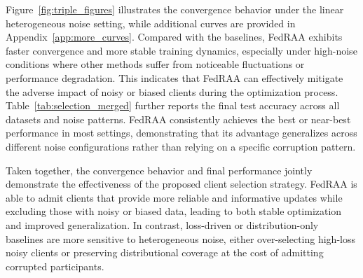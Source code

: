 \documentclass[conference]{IEEEtran}
\theoremstyle{definition}
\theoremstyle{remark}
\begin{document}
Figure~\ref{fig:triple_figures} illustrates the convergence behavior under the linear heterogeneous noise setting, while additional curves are provided in Appendix~\ref{app:more_curves}. Compared with the baselines, FedRAA exhibits faster convergence and more stable training dynamics, especially under high-noise conditions where other methods suffer from noticeable fluctuations or performance degradation. This indicates that FedRAA can effectively mitigate the adverse impact of noisy or biased clients during the optimization process.
Table~\ref{tab:selection_merged} further reports the final test accuracy across all datasets and noise patterns. FedRAA consistently achieves the best or near-best performance in most settings, demonstrating that its advantage generalizes across different noise configurations rather than relying on a specific corruption pattern.

Taken together, the convergence behavior and final performance jointly demonstrate the effectiveness of the proposed client selection strategy. FedRAA is able to admit clients that provide more reliable and informative updates while excluding those with noisy or biased data, leading to both stable optimization and improved generalization. In contrast, loss-driven or distribution-only baselines are more sensitive to heterogeneous noise, either over-selecting high-loss noisy clients or preserving distributional coverage at the cost of admitting corrupted participants.
\end{document}
